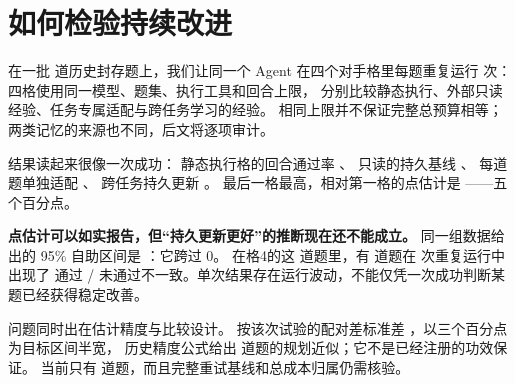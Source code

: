 \chapter{如何检验持续改进}
\label{ch03}


\begin{failurebox}
在一批  道历史封存题上，我们让同一个 Agent 在四个对手格里每题重复运行  次：
四格使用同一模型、题集、执行工具和回合上限，
分别比较静态执行、外部只读经验、任务专属适配与跨任务学习的经验。
相同上限并不保证完整总预算相等；两类记忆的来源也不同，后文将逐项审计。

结果读起来很像一次成功：
静态执行格的回合通过率 、
只读的持久基线 、
每道题单独适配 、
跨任务持久更新 。
最后一格最高，相对第一格的点估计是 ——五个百分点。

\textbf{点估计可以如实报告，但“持久更新更好”的推断现在还不能成立。}
同一组数据给出的 95\% 自助区间是 \measured{$[-0.1000, +0.1750]$}：它跨过 0。
在格4的这  道题里，有  道题在  次重复运行中出现了
通过 / 未通过不一致。单次结果存在运行波动，不能仅凭一次成功判断某题已经获得稳定改善。

问题同时出在估计精度与比较设计。
按该次试验的配对差标准差 ，以三个百分点为目标区间半宽，
历史精度公式给出  道题的规划近似；它不是已经注册的功效保证。
当前只有  道题，而且完整重试基线和总成本归属仍需核验。
\end{failurebox}


